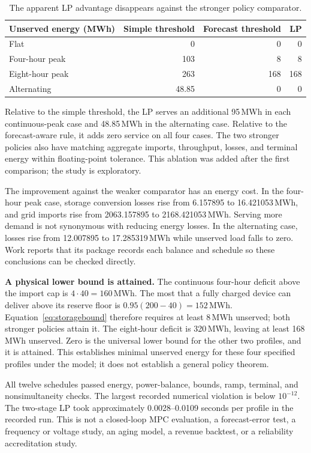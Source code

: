 \documentclass[11pt,letterpaper]{article}
\begin{document}
\begin{table}[ht]
\centering\begin{tabular}{lrrr}
\toprule Unserved energy (MWh) & Simple threshold & Forecast threshold & LP\\\midrule
Flat &0&0&0\\
Four-hour peak &103&8&8\\
Eight-hour peak &263&168&168\\
Alternating &48.85&0&0\\\bottomrule
\end{tabular}
\caption{The apparent LP advantage disappears against the stronger policy comparator.}
\label{tab:bess}
\end{table}

Relative to the simple threshold, the LP serves an additional 95\,MWh in each continuous-peak case and 48.85\,MWh in the alternating case. Relative to the forecast-aware rule, it adds zero service on all four cases. The two stronger policies also have matching aggregate imports, throughput, losses, and terminal energy within floating-point tolerance. This ablation was added after the first comparison; the study is exploratory.

The improvement against the weaker comparator has an energy cost. In the four-hour peak case, storage conversion losses rise from 6.157895 to 16.421053\,MWh, and grid imports rise from 2063.157895 to 2168.421053\,MWh. Serving more demand is not synonymous with reducing energy losses. In the alternating case, losses rise from 12.007895 to 17.285319\,MWh while unserved load falls to zero. Work reports that its package records each balance and schedule so these conclusions can be checked directly.

\textbf{A physical lower bound is attained.} The continuous four-hour deficit above the import cap is $4\cdot40=160$\,MWh. The most that a fully charged device can deliver above its reserve floor is $0.95(200-40)=152$\,MWh. Equation~\eqref{eq:storagebound} therefore requires at least 8\,MWh unserved; both stronger policies attain it. The eight-hour deficit is 320\,MWh, leaving at least 168\,MWh unserved. Zero is the universal lower bound for the other two profiles, and it is attained. This establishes minimal unserved energy for these four specified profiles under the model; it does not establish a general policy theorem.

All twelve schedules passed energy, power-balance, bounds, ramp, terminal, and nonsimultaneity checks. The largest recorded numerical violation is below $10^{-12}$. The two-stage LP took approximately 0.0028--0.0109 seconds per profile in the recorded run. This is not a closed-loop MPC evaluation, a forecast-error test, a frequency or voltage study, an aging model, a revenue backtest, or a reliability accreditation study.
\end{document}
